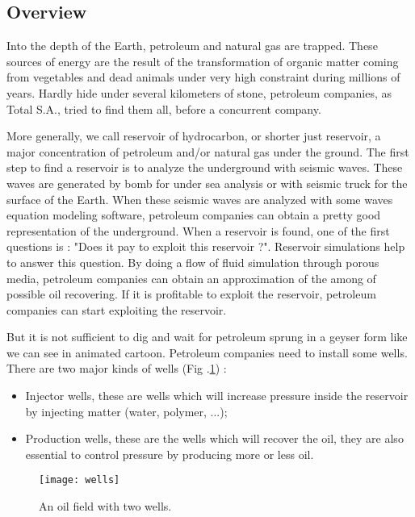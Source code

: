 \subsection{Overview}

%
Into the depth of the Earth, petroleum and natural gas are trapped.
%
These sources of energy are the result of the transformation of organic matter coming from vegetables and dead animals under very high constraint during millions of years.
%
Hardly hide under several kilometers of stone, petroleum companies, as Total S.A., tried to find them all, before a concurrent company.



More generally, we call reservoir of hydrocarbon, or shorter just reservoir, a major concentration of petroleum and/or natural gas under the ground.
%
The first step to find a reservoir is to analyze the underground with seismic waves.
%
These waves are generated by bomb for under sea analysis or with seismic truck for the surface of the Earth.
%
When these seismic waves are analyzed with some waves equation modeling software, petroleum companies can obtain a pretty good representation of the underground.
%
When a reservoir is found, one of the first questions is : "Does it pay to exploit this reservoir ?".
%
Reservoir simulations help to answer this question.
%
By doing a flow of fluid simulation through porous media, petroleum companies can obtain an approximation of the among of possible oil recovering.
%
If it is profitable to exploit the reservoir, petroleum companies can start exploiting the reservoir.



But it is not sufficient to dig and wait for petroleum sprung in a geyser form like we can see in animated cartoon.
%
Petroleum companies need to install some wells.
%
There are two major kinds of wells (Fig .\ref{fig:wells}) :
%
\begin{itemize}
  \item Injector wells, these are wells which will increase pressure inside the reservoir by injecting matter (water, polymer, ...);
  \item Production wells, these are the wells which will recover the oil, they are also essential to control pressure by producing more or less oil.
\end{itemize}

\begin{figure}[!ht]
  \centering
  \texttt{[image: wells]}
  \caption{An oil field with two wells.}
\label{fig:wells}
\end{figure}


